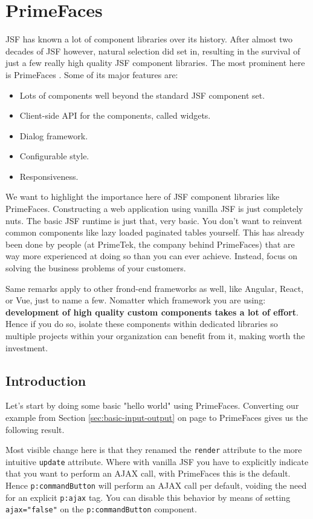 %

\chapter{PrimeFaces}
\label{chap:primefaces}
JSF has known a lot of component libraries over its history.
After almost two decades of JSF however, natural selection did set in,
resulting in the survival of just a few really high quality JSF component libraries.
The most prominent here is PrimeFaces \cite{PrimeFaces}.
Some of its major features are:
\begin{itemize}
	\item Lots of components well beyond the standard JSF component set.
	\item Client-side API for the components, called widgets.
	\item Dialog framework.
	\item Configurable style.
	\item Responsiveness.
\end{itemize}
We want to highlight the importance here of JSF component libraries like PrimeFaces.
Constructing a web application using vanilla JSF is just completely nuts.
The basic JSF runtime is just that, very basic.
You don't want to reinvent common components like lazy loaded paginated tables yourself.
This has already been done by people (at PrimeTek, the company behind PrimeFaces) that are way more experienced at doing so than you can ever achieve.
Instead, focus on solving the business problems of your customers.

Same remarks apply to other frond-end frameworks as well, like Angular, React, or Vue, just to name a few.
Nomatter which framework you are using: \textbf{development of high quality custom components takes a lot of effort}.
Hence if you do so, isolate these components within dedicated libraries so multiple projects within your organization can benefit from it, making worth the investment.


\section{Introduction}
Let's start by doing some basic "hello world" using PrimeFaces.
Converting our  example from Section \ref{sec:basic-input-output}  on page \pageref{sec:basic-input-output} to PrimeFaces gives us the following result.

Most visible change here is that they renamed the \texttt{render} attribute to the more intuitive \texttt{update} attribute.
Where with vanilla JSF you have to explicitly indicate that you want to perform an AJAX call, with PrimeFaces this is the default.
Hence \texttt{p:commandButton} will perform an AJAX call per default, voiding the need for an explicit \texttt{p:ajax} tag.
You can disable this behavior by means of setting \texttt{ajax="false"} on the \texttt{p:commandButton} component.

